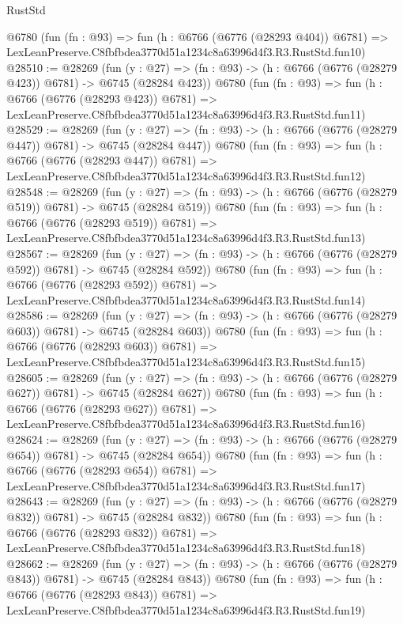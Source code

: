 \begin{lexlean}{RustStd}
\begin{coremodule}
    @6780
    (fun (fn : @93) =>
    fun (h : @6766 (@6776 (@28293 @404)) @6781) =>
    LexLeanPreserve.C8fbfbdea3770d51a1234c8a63996d4f3.R3.RustStd.fun10)
@28510 := @28269
    (fun (y : @27) => (fn : @93) -> (h : @6766 (@6776 (@28279 @423)) @6781) -> @6745 (@28284 @423))
    @6780
    (fun (fn : @93) =>
    fun (h : @6766 (@6776 (@28293 @423)) @6781) =>
    LexLeanPreserve.C8fbfbdea3770d51a1234c8a63996d4f3.R3.RustStd.fun11)
@28529 := @28269
    (fun (y : @27) => (fn : @93) -> (h : @6766 (@6776 (@28279 @447)) @6781) -> @6745 (@28284 @447))
    @6780
    (fun (fn : @93) =>
    fun (h : @6766 (@6776 (@28293 @447)) @6781) =>
    LexLeanPreserve.C8fbfbdea3770d51a1234c8a63996d4f3.R3.RustStd.fun12)
@28548 := @28269
    (fun (y : @27) => (fn : @93) -> (h : @6766 (@6776 (@28279 @519)) @6781) -> @6745 (@28284 @519))
    @6780
    (fun (fn : @93) =>
    fun (h : @6766 (@6776 (@28293 @519)) @6781) =>
    LexLeanPreserve.C8fbfbdea3770d51a1234c8a63996d4f3.R3.RustStd.fun13)
@28567 := @28269
    (fun (y : @27) => (fn : @93) -> (h : @6766 (@6776 (@28279 @592)) @6781) -> @6745 (@28284 @592))
    @6780
    (fun (fn : @93) =>
    fun (h : @6766 (@6776 (@28293 @592)) @6781) =>
    LexLeanPreserve.C8fbfbdea3770d51a1234c8a63996d4f3.R3.RustStd.fun14)
@28586 := @28269
    (fun (y : @27) => (fn : @93) -> (h : @6766 (@6776 (@28279 @603)) @6781) -> @6745 (@28284 @603))
    @6780
    (fun (fn : @93) =>
    fun (h : @6766 (@6776 (@28293 @603)) @6781) =>
    LexLeanPreserve.C8fbfbdea3770d51a1234c8a63996d4f3.R3.RustStd.fun15)
@28605 := @28269
    (fun (y : @27) => (fn : @93) -> (h : @6766 (@6776 (@28279 @627)) @6781) -> @6745 (@28284 @627))
    @6780
    (fun (fn : @93) =>
    fun (h : @6766 (@6776 (@28293 @627)) @6781) =>
    LexLeanPreserve.C8fbfbdea3770d51a1234c8a63996d4f3.R3.RustStd.fun16)
@28624 := @28269
    (fun (y : @27) => (fn : @93) -> (h : @6766 (@6776 (@28279 @654)) @6781) -> @6745 (@28284 @654))
    @6780
    (fun (fn : @93) =>
    fun (h : @6766 (@6776 (@28293 @654)) @6781) =>
    LexLeanPreserve.C8fbfbdea3770d51a1234c8a63996d4f3.R3.RustStd.fun17)
@28643 := @28269
    (fun (y : @27) => (fn : @93) -> (h : @6766 (@6776 (@28279 @832)) @6781) -> @6745 (@28284 @832))
    @6780
    (fun (fn : @93) =>
    fun (h : @6766 (@6776 (@28293 @832)) @6781) =>
    LexLeanPreserve.C8fbfbdea3770d51a1234c8a63996d4f3.R3.RustStd.fun18)
@28662 := @28269
    (fun (y : @27) => (fn : @93) -> (h : @6766 (@6776 (@28279 @843)) @6781) -> @6745 (@28284 @843))
    @6780
    (fun (fn : @93) =>
    fun (h : @6766 (@6776 (@28293 @843)) @6781) =>
    LexLeanPreserve.C8fbfbdea3770d51a1234c8a63996d4f3.R3.RustStd.fun19)

\end{coremodule}
\end{lexlean}

